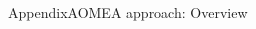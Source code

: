 \begin{frame}{Appendix}{AOMEA approach: Overview}
\begin{columns}
        \begin{column}{0.4\textwidth}
            \centering
        \end{column}

    \end{columns}

\end{frame}



